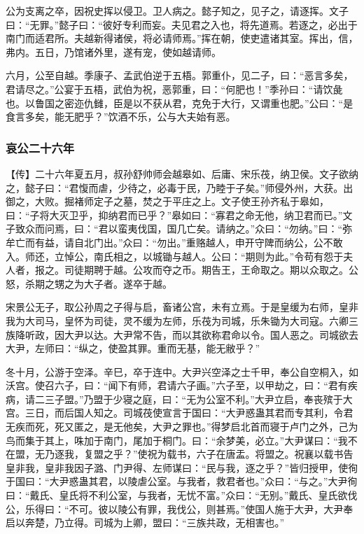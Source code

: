 \documentclass[]{article}
\begin{document}
公为支离之卒，因祝史挥以侵卫。卫人病之。懿子知之，见子之，请逐挥。文子曰：``无罪。''懿子曰：``彼好专利而妄。夫见君之入也，将先道焉。若逐之，必出于南门而适君所。夫越新得诸侯，将必请师焉。''挥在朝，使吏遣诸其室。挥出，信，弗内。五日，乃馆诸外里，遂有宠，使如越请师。

六月，公至自越。季康子、孟武伯逆于五梧。郭重仆，见二子，曰：``恶言多矣，君请尽之。''公宴于五梧，武伯为祝，恶郭重，曰：``何肥也！''季孙曰：``请饮彘也。以鲁国之密迩仇雠，臣是以不获从君，克免于大行，又谓重也肥。''公曰：``是食言多矣，能无肥乎？''饮酒不乐，公与大夫始有恶。

\hypertarget{header-n3292}{%
\subsubsection{哀公二十六年}\label{header-n3292}}

【传】二十六年夏五月，叔孙舒帅师会越皋如、后庸、宋乐茷，纳卫侯。文子欲纳之，懿子曰：``君愎而虐，少待之，必毒于民，乃睦于子矣。''师侵外州，大获。出御之，大败。掘褚师定子之墓，焚之于平庄之上。文子使王孙齐私于皋如，曰：``子将大灭卫乎，抑纳君而已乎？''皋如曰：``寡君之命无他，纳卫君而已。''文子致众而问焉，曰：``君以蛮夷伐国，国几亡矣。请纳之。''众曰：``勿纳。''曰：``弥牟亡而有益，请自北门出。''众曰：``勿出。''重赂越人，申开守陴而纳公，公不敢入。师还，立悼公，南氏相之，以城锄与越人。公曰：``期则为此。''令苟有怨于夫人者，报之。司徒期聘于越。公攻而夺之币。期告王，王命取之。期以众取之。公怒，杀期之甥之为大子者。遂卒于越。

宋景公无子，取公孙周之子得与启，畜诸公宫，未有立焉。于是皇缓为右师，皇非我为大司马，皇怀为司徒，灵不缓为左师，乐茷为司城，乐朱锄为大司寇。六卿三族降听政，因大尹以达。大尹常不告，而以其欲称君命以令。国人恶之。司城欲去大尹，左师曰：``纵之，使盈其罪。重而无基，能无敝乎？''

冬十月，公游于空泽。辛巳，卒于连中。大尹兴空泽之士千甲，奉公自空桐入，如沃宫。使召六子，曰：``闻下有师，君请六子画。''六子至，以甲劫之，曰：``君有疾病，请二三子盟。''乃盟于少寝之庭，曰：``无为公室不利。''大尹立启，奉丧殡于大宫。三日，而后国人知之。司城茷使宣言于国曰：``大尹惑蛊其君而专其利，令君无疾而死，死又匿之，是无他矣，大尹之罪也。''得梦启北首而寝于卢门之外，己为鸟而集于其上，咮加于南门，尾加于桐门。曰：``余梦美，必立。''大尹谋曰：``我不在盟，无乃逐我，复盟之乎？''使祝为载书，六子在唐盂。将盟之。祝襄以载书告皇非我，皇非我因子潞、门尹得、左师谋曰：``民与我，逐之乎？''皆归授甲，使徇于国曰：``大尹惑蛊其君，以陵虐公室。与我者，救君者也。''众曰：``与之。''大尹徇曰：``戴氏、皇氏将不利公室，与我者，无忧不富。''众曰：``无别。''戴氏、皇氏欲伐公，乐得曰：``不可。彼以陵公有罪，我伐公，则甚焉。''使国人施于大尹，大尹奉启以奔楚，乃立得。司城为上卿，盟曰：``三族共政，无相害也。''
\end{document}
